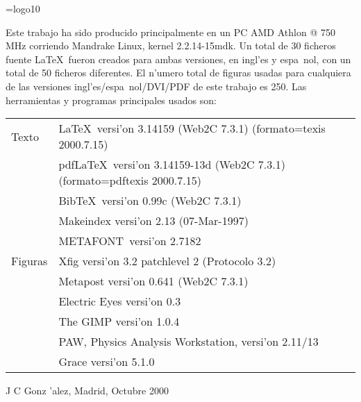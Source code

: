 
\thispagestyle{empty}
%
\mbox{}
%
\newpage
%
\thispagestyle{empty}
%
\mbox{}
%
\vfill
%
\scriptsize

\font\logo=logo10
\def\MF{\strut\hbox{\logo METAFONT}}\def\.#1{\strut\hbox{\tt #1}}

Este trabajo ha sido producido principalmente en un PC AMD Athlon @
750 MHz corriendo Mandrake Linux, kernel 2.2.14-15mdk. Un total de 30
ficheros fuente \LaTeX\ fueron creados para ambas versiones, en ingl'es y 
espa~nol, con un total de 50 ficheros diferentes. El n'umero total de
figuras usadas para cualquiera de las versiones
ingl'es/espa~nol/DVI/PDF de este trabajo es 250. Las herramientas y
programas principales usados son:\\

\begin{tabular}{ll}

Texto
 & \LaTeX\ versi'on 3.14159 (Web2C 7.3.1) (formato=texis 2000.7.15)\\
 & pdf\LaTeX\ versi'on 3.14159-13d (Web2C 7.3.1) (formato=pdftexis 2000.7.15)\\
 & Bib\TeX\ versi'on 0.99c (Web2C 7.3.1)\\
 & Makeindex versi'on 2.13 (07-Mar-1997)\\
 & \MF\ versi'on 2.7182 \vspace{4pt}\\

Figuras
 & Xfig  versi'on 3.2 patchlevel 2 (Protocolo 3.2)\\
 & Metapost versi'on 0.641 (Web2C 7.3.1)\\
 & Electric Eyes versi'on 0.3\\
 & The GIMP versi'on 1.0.4\\
 & PAW, Physics Analysis Workstation, versi'on 2.11/13 \\
 & Grace versi'on 5.1.0\\

\end{tabular}

\raggedleft J C Gonz
'alez, Madrid, Octubre 2000

\endinput
%


